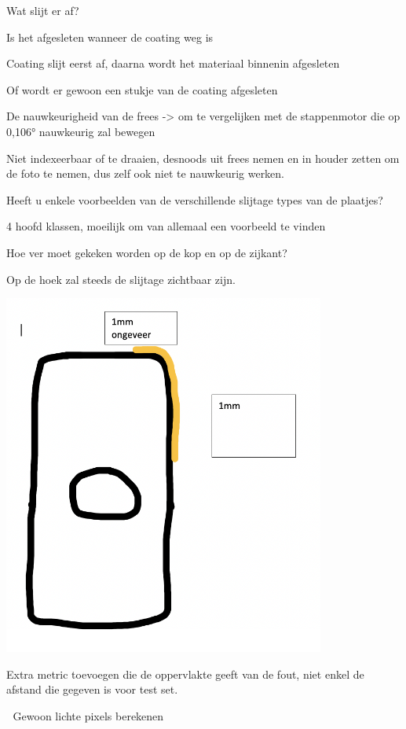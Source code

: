 \documentclass{scrartcl}
\begin{document}
Wat slijt er af?

	Is het afgesleten wanneer de coating weg is
	
		Coating slijt eerst af, daarna wordt het materiaal binnenin afgesleten
		
	Of wordt er gewoon een stukje van de coating afgesleten
	


De nauwkeurigheid van de frees -\textgreater{} om te vergelijken met de stappenmotor die op 0,106° nauwkeurig zal bewegen 

	Niet indexeerbaar of te draaien, desnoods uit frees nemen en in houder zetten om de foto te nemen, dus zelf ook niet te nauwkeurig werken.
	
	





Heeft u enkele voorbeelden van de verschillende slijtage types van de plaatjes?

	4 hoofd klassen, moeilijk om van allemaal een voorbeeld te vinden
	




Hoe ver moet gekeken worden op de kop en op de zijkant?

	Op de hoek zal steeds de slijtage zichtbaar zijn.
	
	

\includegraphics[width=4.166667in, keepaspectratio=true]{./Masterproef_Tool_Wear_Inspection_-_Meeting3_TJ/Screenshot 2020-11-20 at 15.20.56.png}



Extra metric toevoegen die de oppervlakte geeft van de fout, niet enkel de afstand die gegeven is voor test set. 

	Gewoon lichte pixels berekenen
\end{document}
